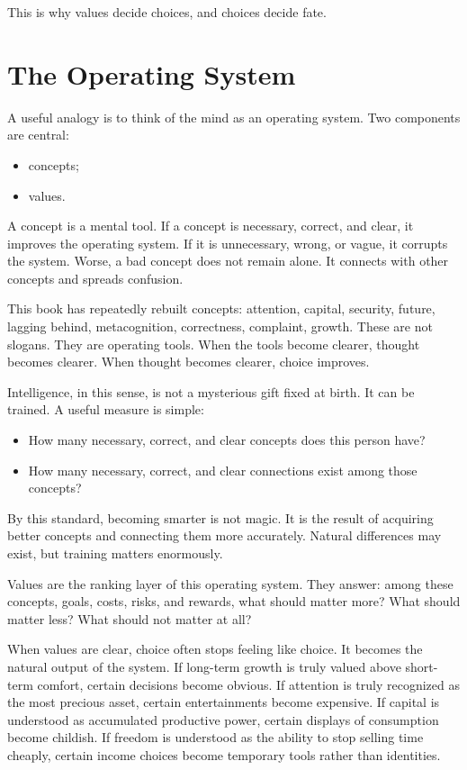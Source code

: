 This is why values decide choices, and choices decide fate.

\section*{The Operating System}

A useful analogy is to think of the mind as an operating system. Two components are central:

\begin{itemize}
\item concepts;
\item values.
\end{itemize}

A concept is a mental tool. If a concept is necessary, correct, and clear, it improves the operating system. If it is unnecessary, wrong, or vague, it corrupts the system. Worse, a bad concept does not remain alone. It connects with other concepts and spreads confusion.

This book has repeatedly rebuilt concepts: attention, capital, security, future, lagging behind, metacognition, correctness, complaint, growth. These are not slogans. They are operating tools. When the tools become clearer, thought becomes clearer. When thought becomes clearer, choice improves.

Intelligence, in this sense, is not a mysterious gift fixed at birth. It can be trained. A useful measure is simple:

\begin{itemize}
\item How many necessary, correct, and clear concepts does this person have?
\item How many necessary, correct, and clear connections exist among those concepts?
\end{itemize}

By this standard, becoming smarter is not magic. It is the result of acquiring better concepts and connecting them more accurately. Natural differences may exist, but training matters enormously.

Values are the ranking layer of this operating system. They answer: among these concepts, goals, costs, risks, and rewards, what should matter more? What should matter less? What should not matter at all?

When values are clear, choice often stops feeling like choice. It becomes the natural output of the system. If long-term growth is truly valued above short-term comfort, certain decisions become obvious. If attention is truly recognized as the most precious asset, certain entertainments become expensive. If capital is understood as accumulated productive power, certain displays of consumption become childish. If freedom is understood as the ability to stop selling time cheaply, certain income choices become temporary tools rather than identities.

